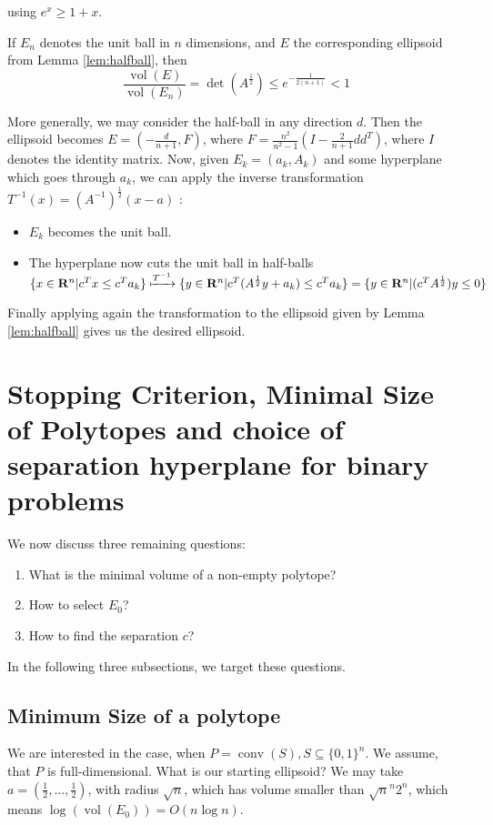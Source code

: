 \documentclass[10pt]{article}
\newcommand{\R}{\mathbf{R}}
\newcommand{\transpose}{T}
\newcommand{\vol}{\operatorname{vol}}
\newcommand{\conv}{\operatorname{conv}}
\begin{document}
using $e^x \geq 1 + x$.
\begin{corollary}
If $E_n$ denotes the unit ball in $n$ dimensions, and $E$ the corresponding ellipsoid from Lemma \ref{lem:halfball}, then
\[
\frac{\vol (E)}{\vol (E_n)} = \det (A^{\frac{1}{2}}) \le e^{-\frac{1}{2(n+1)}}<1
\]
\end{corollary}
More generally, we may consider the half-ball in any direction $d$. Then the ellipsoid becomes $E = (-\frac{d}{n+1}, F)$, where $F = \frac{n^2}{n^2-1} (I - \frac{2}{n+1} dd^\transpose)$, where $I$ denotes the identity matrix. Now, given $E_k = (a_k, A_k)$ and some hyperplane which goes through $a_k$, we can apply the inverse transformation $T^{-1} (x) = (A^{-1})^{\frac{1}{2}} (x-a)$ :
\begin{itemize}
\item $E_k$ becomes the unit ball. 
\item The hyperplane now cuts the unit ball in half-balls $\{x\in \R^n | c^\transpose x \le c^\transpose a_k \} \xmapsto{T^{-1}} \{y\in \R^n | c^\transpose (A^{\frac{1}{2}} y + a_k ) \le c^\transpose a_k\} = \{y \in \R^n | (c^\transpose A^{\frac{1}{2}}) y \le 0 \}$
\end{itemize}
Finally applying again the transformation to the ellipsoid given by Lemma \ref{lem:halfball} gives us the desired ellipsoid.


\section{Stopping Criterion, Minimal Size of Polytopes and choice of separation hyperplane for binary problems}
We now discuss three remaining questions:
\begin{enumerate}
\item What is the minimal volume of a non-empty polytope?
\item How to select $E_0$?
\item How to find the separation $c$?
\end{enumerate}
In the following three subsections, we target these questions.
\subsection{Minimum Size of a polytope}
We are interested in the case, when $P = \conv (S), S \subseteq \{0,1\}^n$. We assume, that $P$ is full-dimensional. What is our starting ellipsoid? We may take $a = (\frac{1}{2}, \dots, \frac{1}{2})$, with radius $\sqrt{n}$, which has volume smaller than $\sqrt{n}^{n} 2^n$, which means $\log (\vol (E_0)) = O(n \log n)$. 
\end{document}
